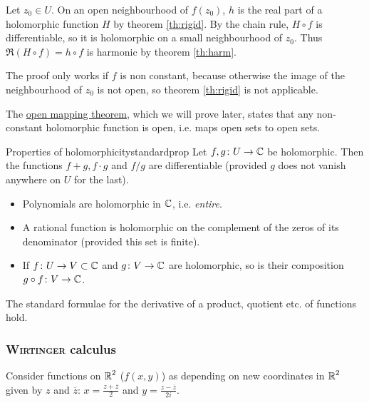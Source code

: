 \documentclass[a4paper,english]{article}
\begin{document}
\begin{pr}
    Let $z_0 \in U$.
    On an open neighbourhood of $f(z_0)$, $h$ is the real part of a holomorphic function $H$ by theorem \ref{th:rigid}.
    By the chain rule, $H \circ f$ is differentiable, so it is holomorphic on a small neighbourhood of $z_0$.
    Thus $\Re(H \circ f) = h \circ f$ is harmonic by theorem \ref{th:harm}.
\end{pr}

\begin{remark}
    The proof only works if $f$ is non constant, because otherwise the image of the neighbourhood of $z_0$ is not open, so theorem \ref{th:rigid} is not applicable.
    
    The \hyperref[th:OM]{open mapping theorem}, which we will prove later, states that any non-constant holomorphic function is open, i.e. maps open sets to open sets.
\end{remark}


\begin{thm}{Properties of holomorphicity}{standardprop}
    Let $f, g \colon U \to \operatorname{\mathbb{C}}$ be holomorphic.
    Then the functions $f + g, f \cdot g$ and $f / g$ are differentiable (provided $g$ does not vanish anywhere on $U$ for the last).
\end{thm}

\begin{cor}
    \begin{itemize}
        \item 
        Polynomials are holomorphic in $\operatorname{\mathbb{C}}$, i.e. \emph{entire}.
         
        \item
        A rational function is holomorphic on the complement of the zeros of its denominator (provided this set is finite).
        
        \item
        If $f \colon U \to V \subset \operatorname{\mathbb{C}}$ and $g \colon V \to \operatorname{\mathbb{C}}$ are holomorphic, so is their composition $g \circ f \colon V \to \operatorname{\mathbb{C}}$.
    \end{itemize}
\end{cor}

\begin{remark}
    The standard formulae for the derivative of a product, quotient etc. of functions hold.
\end{remark}

\subsubsection{\textsc{Wirtinger} calculus} \label{subsubsection:Wirtinger}
    Consider functions on $\operatorname{\mathbb{R}}^2$ ($f(x,y)$) as depending on new coordinates in $\operatorname{\mathbb{R}}^2$ given by $z$ and $\overline{z}$: $x = \frac{z + \overline{z}}{2}$ and $y = \frac{z - \overline{z}}{2 i}$.
        
\end{document}

